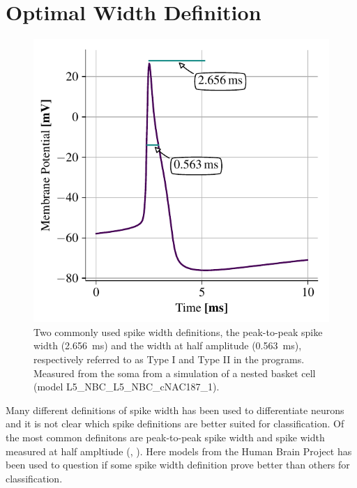 \documentclass[altfont, fleqn]{uiophd}
\renewcommand{\cref}[1]{{\color{viridis_03}\mycref{#1}}}
\begin{document}
\newpage
\section{Optimal Width Definition}
\begin{figure}
    \vspace{-20pt}
    \begin{center}
        \includegraphics[width=\linewidth]{images/sec_4/widthdef_soma_mem_small.pdf}
        \vspace{-20pt}
        \caption{%
            Two commonly used spike width definitions, 
            the peak-to-peak spike width
            (\SI{2.656}{\milli\second})
            and 
            the width at half amplitude
            (\SI{0.563}{\milli\second}),
            respectively referred to as Type I and Type II in the programs.
            Measured from the soma from a simulation of a nested basket cell 
            (model L5\_NBC\_L5\_NBC\_cNAC187\_1).
            }
        \label{fig:4_width_def}
        \vspace{-10pt}
    \end{center}
\end{figure}

Many different definitions of spike width has been used to differentiate neurons
and it is not clear which spike definitions are better suited for classification.
Of the most common definitons are 
peak-to-peak spike width 
and 
spike width measured at half ampltiude 
(\textcite{bean_action_2007}, \cref{fig:4_width_def}).
Here models from the Human Brain Project
has been used to question
if some spike width definition prove better than others for classification.
\end{document}

